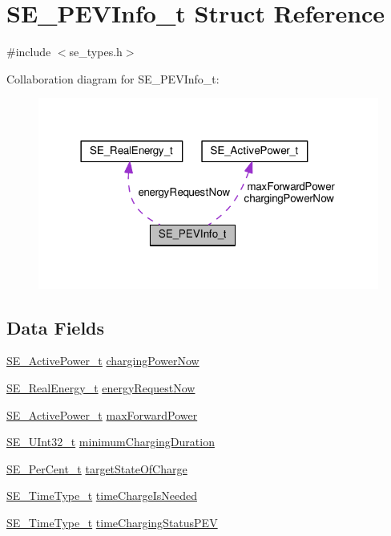 \hypertarget{structSE__PEVInfo__t}{}\section{S\+E\+\_\+\+P\+E\+V\+Info\+\_\+t Struct Reference}
\label{structSE__PEVInfo__t}


{\ttfamily \#include $<$se\+\_\+types.\+h$>$}



Collaboration diagram for S\+E\+\_\+\+P\+E\+V\+Info\+\_\+t\+:\nopagebreak
\begin{figure}[H]
\begin{center}
\leavevmode
\includegraphics[width=318pt]{structSE__PEVInfo__t__coll__graph}
\end{center}
\end{figure}
\subsection*{Data Fields}
\begin{DoxyCompactItemize}
\item 
\hyperlink{structSE__ActivePower__t}{S\+E\+\_\+\+Active\+Power\+\_\+t} \hyperlink{group__PEVInfo_ga0ef709bf9f4b4b2157b2c82ef43d39aa}{charging\+Power\+Now}
\item 
\hyperlink{structSE__RealEnergy__t}{S\+E\+\_\+\+Real\+Energy\+\_\+t} \hyperlink{group__PEVInfo_gad47c45664492878b0b3afc247a5d5522}{energy\+Request\+Now}
\item 
\hyperlink{structSE__ActivePower__t}{S\+E\+\_\+\+Active\+Power\+\_\+t} \hyperlink{group__PEVInfo_ga7c062430150ff29489e36e8d96e0b12c}{max\+Forward\+Power}
\item 
\hyperlink{group__UInt32_ga70bd4ecda3c0c85d20779d685a270cdb}{S\+E\+\_\+\+U\+Int32\+\_\+t} \hyperlink{group__PEVInfo_ga5f6d6597c160908cc295b6d1392e9225}{minimum\+Charging\+Duration}
\item 
\hyperlink{group__PerCent_ga14278cbee754c63496035b722b417ddc}{S\+E\+\_\+\+Per\+Cent\+\_\+t} \hyperlink{group__PEVInfo_ga36d8d6c62de4e5fe59431faa1f847189}{target\+State\+Of\+Charge}
\item 
\hyperlink{group__TimeType_ga6fba87a5b57829b4ff3f0e7638156682}{S\+E\+\_\+\+Time\+Type\+\_\+t} \hyperlink{group__PEVInfo_ga2f882d30896a2cc714f4e3c852e4fc74}{time\+Charge\+Is\+Needed}
\item 
\hyperlink{group__TimeType_ga6fba87a5b57829b4ff3f0e7638156682}{S\+E\+\_\+\+Time\+Type\+\_\+t} \hyperlink{group__PEVInfo_ga3c4bef34dcb71114ec8bc685a1df5280}{time\+Charging\+Status\+P\+EV}
\end{DoxyCompactItemize}


